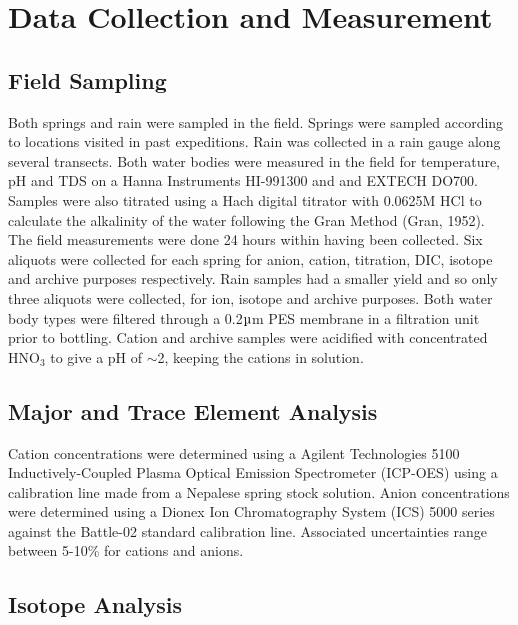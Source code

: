 
\newpage

\section{Data Collection and Measurement}



\subsection{Field Sampling}
Both springs and rain were sampled in the field. Springs were sampled according to locations visited in past expeditions. Rain was collected in a rain gauge along several transects. Both water bodies were measured in the field for temperature, pH and TDS on a Hanna Instruments HI-991300 and and EXTECH DO700. Samples were also titrated using a Hach digital titrator with 0.0625M HCl to calculate the alkalinity of the water following the Gran Method (Gran, 1952). The field measurements were done 24 hours within having been collected.  Six aliquots were collected for each spring for anion, cation, titration, DIC, isotope and archive purposes respectively.  Rain samples had a smaller yield and so only three aliquots were collected, for ion, isotope and archive purposes. Both water body types were filtered through a 0.2$\micro$m PES membrane in a filtration unit prior to bottling. Cation and archive samples were acidified with concentrated HNO$_3$ to give a pH of $\sim$2, keeping the cations in solution. 


\subsection{Major and Trace Element Analysis}

Cation concentrations were determined using a Agilent Technologies 5100 Inductively-Coupled Plasma Optical Emission Spectrometer (ICP-OES) using a calibration line made from a Nepalese spring stock solution. Anion concentrations were determined using a Dionex Ion Chromatography System (ICS) 5000 series against the Battle-02 standard calibration line. Associated uncertainties range between 5-10\% for cations and anions.


\subsection{Isotope Analysis}

